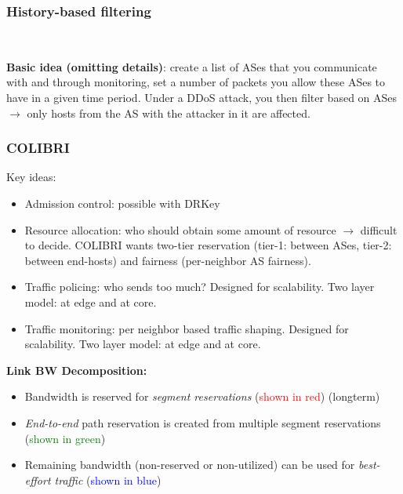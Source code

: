 \documentclass[11pt,oneside,a4paper]{article}
\begin{document}
\subsubsection{History-based filtering}\

\noindent \textbf{Basic idea (omitting details)}: create a list of ASes that you communicate with and through monitoring, set a number of packets you allow these ASes to have in a given time period. Under a DDoS attack, you then filter based on ASes $\rightarrow$ only hosts from the AS with the attacker in it are affected.

\newpage

\subsubsection{COLIBRI}

Key ideas:

\vspace{-\topsep}
\begin{itemize}
	\setlength{\itemsep}{0pt}
	\setlength{\parskip}{0pt}
	\item Admission control: possible with DRKey
	\item Resource allocation: who should obtain some amount of resource $\rightarrow$ difficult to decide. COLIBRI wants two-tier reservation (tier-1: between ASes, tier-2: between end-hosts) and fairness (per-neighbor AS fairness).
	\item Traffic policing: who sends too much? Designed for scalability. Two layer model: at edge and at core.
	\item Traffic monitoring: per neighbor based traffic shaping. Designed for scalability. Two layer model: at edge and at core.
\end{itemize}
\vspace{-\topsep}

\noindent \textbf{Link BW Decomposition:}

\vspace{-\topsep}
\begin{itemize}
	\setlength{\itemsep}{0pt}
	\setlength{\parskip}{0pt}
	\item Bandwidth is reserved for \textit{segment reservations} (\textcolor{red}{shown in red}) (longterm)
	\item \textit{End-to-end} path reservation is created from multiple segment reservations \\
	(\textcolor{green}{shown in green})
	\item Remaining bandwidth (non-reserved or non-utilized) can be used for \textit{best-effort traffic} (\textcolor{blue}{shown in blue})
\end{itemize}
\vspace{-\topsep}
\end{document}
